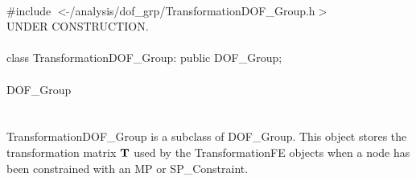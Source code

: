 
   \\
\indent \#include $<\tilde{ }$/analysis/dof\_grp/TransformationDOF\_Group.h$>$  \\

UNDER CONSTRUCTION.\\

  \\
\indent class TransformationDOF\_Group: public DOF\_Group;  \\


  \\
\indent DOF\_Group \\
\indent{} \\ 

  \\
\indent TransformationDOF\_Group is a subclass of DOF\_Group. This
object stores the transformation matrix ${\bf T}$ used by the
TransformationFE objects when a node has been constrained with an MP
or SP\_Constraint.


